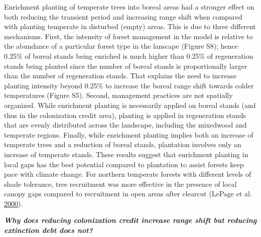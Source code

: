 \documentclass[12pt]{article}
\begin{document}
Enrichment planting of temperate trees into boreal areas had a stronger
effect on both reducing the transient period and increasing range shift
when compared with planting temperate in disturbed (empty) areas. This
is due to three different mechanisms. First, the intensity of forest
management in the model is relative to the abundance of a particular
forest type in the lanscape (Figure S8); hence 0.25\% of boreal stands
being enriched is much higher than 0.25\% of regeneration stands being
planted since the number of boreal stands is proportionally larger than
the number of regeneration stands. That explains the need to increase
planting intensity beyond 0.25\% to increase the boreal range shift
towards colder temperatures (Figure S5). Second, management practices
are not spatially organized. While enrichment planting is necessarily
applied on boreal stands (and thus in the colonization credit area),
planting is applied in regeneration stands that are evenly distributed
across the landscape, including the mixedwood and temperate regions.
Finally, while enrichment planting implies both an increase of temperate
trees and a reduction of boreal stands, plantation involves only an
increase of temperate stands. These results suggest that enrichment
planting in local gaps has the best potential compared to plantation to
assist forests keep pace with climate change. For northern temperate
forests with different levels of shade tolerance, tree recruitment was
more effective in the presence of local canopy gaps compared to
recruitment in open areas after clearcut (LePage et al.
\protect\hyperlink{ref-LePage2000}{2000}).

\textbf{\emph{Why does reducing colonization credit increase range shift
but reducing extinction debt does not?}}
\end{document}
